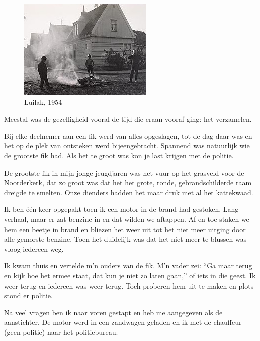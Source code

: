 \documentclass[12pt,twoside, openright]{memoir}
\begin{document}
\begin{figure}
\includegraphics[width=\textwidth]{img/ch9/luilak1954}
\caption*{\footnotesize Luilak, 1954}
\end{figure}

Meestal was de gezelligheid vooral de tijd die eraan vooraf ging: het verzamelen. 

Bij elke deelnemer aan een fik werd van alles opgeslagen, tot de dag daar was en het op de plek van ontsteken werd bijeengebracht. Spannend was natuurlijk wie de grootste fik had. Als het te groot was kon je last krijgen met de politie.

De grootste fik in mijn jonge jeugdjaren was het vuur op het grasveld voor de Noorderkerk, dat zo groot was dat het het grote, ronde, gebrandschilderde raam dreigde te smelten. Onze dienders hadden het maar druk met al het kattekwaad. 

Ik ben één keer opgepakt toen ik een motor in de brand had gestoken. Lang verhaal, maar er zat benzine in en dat wilden we aftappen. Af en toe staken we hem een beetje in brand en bliezen het weer uit tot het niet meer uitging door alle gemorste benzine. Toen het duidelijk was dat het niet meer te blussen was vloog iedereen weg. 

Ik kwam thuis en vertelde m’n ouders van de fik. M’n vader zei: ``Ga maar terug en kijk hoe het ermee staat, dat kun je niet zo laten gaan,'' of iets in die geest. Ik weer terug en iedereen was weer terug. Toch proberen hem uit te maken en plots stond er politie. 

Na veel vragen ben ik naar voren gestapt en heb me aangegeven als de aanstichter. De motor werd in een zandwagen geladen en ik met de chauffeur (geen politie) naar het politiebureau. 
\end{document}
